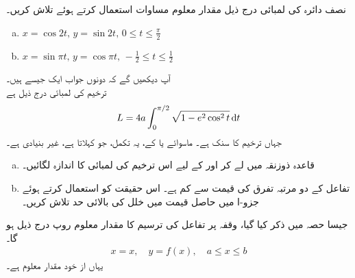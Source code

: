 \\
\\
نصف دائرہ  کی لمبائی درج ذیل مقدار معلوم مساوات استعمال کرتے ہوئے تلاش کریں۔
\begin{enumerate}[a.]
\item
$x=\cos 2t,\, y=\sin 2t,\, 0\le t\le \tfrac{\pi}{2}$
\item
$x=\sin \pi t,\, y=\cos \pi t,\, -\frac{1}{2}\le t\le \frac{1}{2}$
\end{enumerate}
آپ دیکھیں گے کہ دونوں جواب ایک جیسے  ہیں۔
\\
ترخیم  کی لمبائی درج ذیل ہے
\begin{align*}
L=4a\int_0^{\pi/2}\sqrt{1-e^2\cos^2t}\dif t
\end{align*}
جہاں  ترخیم کا سنک ہے۔ ماسوائے  یا   کے، یہ تکمل، جو  کہلاتا ہے، غیر بنیادی ہے۔ 
\begin{enumerate}[a.]
\item
قاعدہ ذوزنقہ میں  لے کر  اور  کے لیے  اس ترخیم کی لمبائی کا اندازہ لگائیں۔
\item
تفاعل  کے دو  مرتبہ تفرق کی قیمت  سے کم ہے۔ اس حقیقت کو استعمال کرتے ہوئے جزو-ا میں حاصل قیمت میں خلل کی بالائی حد تلاش کریں۔
\end{enumerate}
جیسا حصہ  میں ذکر کیا گیا، وقفہ  پر تفاعل  کی  ترسیم کا مقدار معلوم روپ درج ذیل ہو گا۔
\begin{align*}
x=x,\quad y=f(x),\quad a\le x\le b
\end{align*} 
یہاں  از خود مقدار معلوم ہے۔

